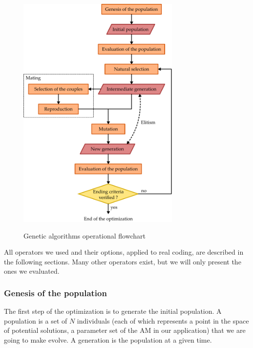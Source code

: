 \documentclass[twocol]{ametsoc}
\begin{document}
\begin{figure}[htb]
	\noindent\includegraphics[width=19pc,angle=0]{figures/figure_structure_gas.pdf}\\
	\caption{Genetic algorithms operational flowchart}
	\label{fig:structure_gas}
\end{figure}

All operators we used and their options, applied to real coding, are described in the following sections. Many other operators exist, but we will only present the ones we evaluated.

\subsubsection{Genesis of the population}

The first step of the optimization is to generate the initial population. A population is a set of $N$ individuals (each of which represents a point in the space of potential solutions, a parameter set of the AM in our application) that we are going to make evolve. A generation is the population at a given time. 
\end{document}
